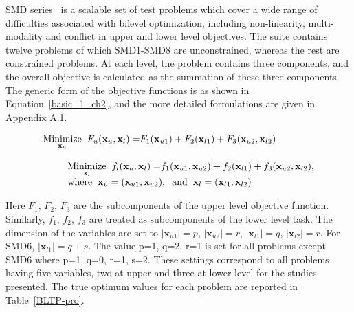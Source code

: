 SMD series~\cite{sinha2014test} is a scalable set of test problems which cover a wide range of difficulties associated with bilevel optimization, including non-linearity, multi-modality and conflict in upper and lower level objectives. 
The suite contains twelve problems of which SMD1-SMD8 are unconstrained, whereas the rest are constrained problems. At each level, the problem contains three components, and the overall objective is calculated as the summation of these three components. The generic form of the objective functions is as shown in Equation~\ref{basic_1_ch2}, and the more detailed formulations are given in Appendix A.1.

\begin{equation}
\begin{array}{lr}
 \underset{\mathbf{x}_u}{\text{Minimize}} \hspace{2mm} F_u(\mathbf{x}_u, \mathbf{ x}_l)=$$F_1(\mathbf{x}_{u1})+F_2(\mathbf{x}_{l1}) +F_3(\mathbf{x}_{u2}, \mathbf{x}_{l2})$$\\
 \text{ }\\
\hspace{9mm}\underset{\mathbf{x}_l}{\text{Minimize}}\hspace{2mm} f_l(\mathbf{x}_u, \mathbf{ x}_l)=$$f_1( \mathbf{x}_{u1}, \mathbf{x}_{u2})+f_2(\mathbf{x}_{l1}) +f_3(\mathbf{x}_{u2}, \mathbf{x}_{l2})$$,\\
\hspace{9mm} \text {where}\hspace{2mm}\mathbf{x}_u=( \mathbf{x}_{u1}, \mathbf{x}_{u2}), \hspace{2mm} \text{and} \hspace{2mm} \mathbf{x}_l=( \mathbf{x}_{l1}, \mathbf{x}_{l2})\\
\end{array}
\label{basic_1_ch2}
\end{equation}

Here $F_1$, $F_2$, $F_3$ are the subcomponents of the upper level objective function. Similarly, $f_1$, $f_2$, $f_3$ are treated as subcomponents of the lower level task. The dimension of the variables are set to $|\mathbf{x}_{u1}|=p$, $| \mathbf{x}_{u2}|=r$, $|\mathbf{x}_{l1}|=q$, $| \mathbf{x}_{l2}|=r$. For SMD6, $|\mathbf{x}_{l1}|=q+s$. The value p=1, q=2, r=1 is set for all problems except SMD6 where p=1, q=0, r=1, s=2. These settings correspond to all problems having five variables, two at upper and three at lower level for the studies presented.  The true optimum values for each problem are reported in Table~\ref{BLTP-pro}.

